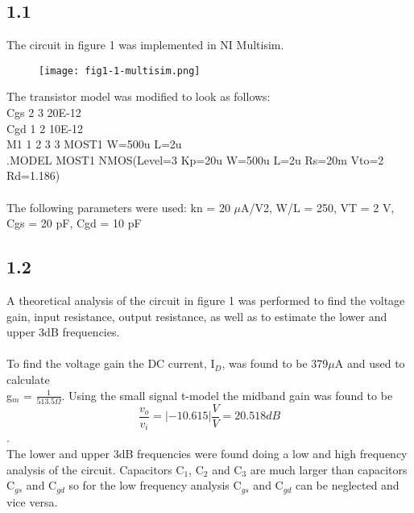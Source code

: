 \subsection*{1.1}
  The circuit in figure 1 was implemented in NI Multisim.\\

    \begin{figure}[h!]
        \centering
        \texttt{[image: fig1-1-multisim.png]}
    \end{figure} 

  The  transistor  model was modified to look as follows:\\
  Cgs  2 3 20E-12\\ 
  Cgd 1 2 10E-12\\
  M1 1 2 3 3 MOST1 W=500u L=2u\\
  .MODEL MOST1 NMOS(Level=3 Kp=20u W=500u L=2u Rs=20m Vto=2 Rd=1.186)\\\\

  The following parameters were used: kn =  20  $\mu$A/V2,  W/L =  250,  VT =  2  V,  Cgs =  20  pF, Cgd = 10 pF\\
\pagebreak
\subsection*{1.2}

  A theoretical analysis of the circuit in figure 1 was performed to find the voltage gain, input resistance, output resistance, as well as to estimate the lower and upper 3dB frequencies.\\\\

  To find the voltage gain the DC current, I$_D$, was found to be 379$\mu$A and used to calculate\\ g$_m$ = $\frac{1}{513.5 \Omega}$. Using the small signal t-model the midband gain was found to be $$\frac{v_o}{v_i} = |-10.615| \frac{V}{V} = 20.518 dB$$.\\

  The lower and upper 3dB frequencies were found doing a low and high frequency analysis of the circuit. Capacitors C$_1$, C$_2$ and C$_3$ are much larger than capacitors C$_{gs}$ and C$_{gd}$ so for the low frequency analysis C$_{gs}$ and C$_{gd}$ can be neglected and vice versa.\\

